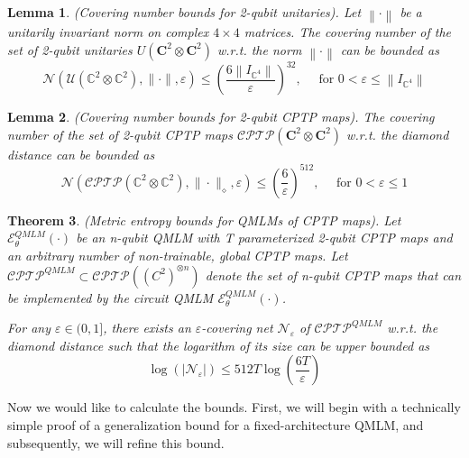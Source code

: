 \documentclass[%
 reprint,
 amsmath,amssymb,
 aps,
]{revtex4-2}
\newcommand{\E}{\mathcal{E}}
\newcommand{\norm}[1]{\left\lVert#1\right\rVert}
\newtheorem{theorem}{Theorem}[section]
\newtheorem{lemma}[theorem]{Lemma}
\begin{document}
\begin{lemma}
    (Covering number bounds for 2-qubit unitaries). Let $\norm{\cdot}$ be a unitarily invariant norm on complex $4 \times 4$ matrices. The covering number of the set of 2-qubit unitaries $U(\mathbf{C}^2 \otimes \mathbf{C}^2)$ w.r.t. the norm $\norm{\cdot}$ can be bounded as
    \begin{equation}
    \mathcal{N}\left(\mathcal{U}\left(\mathbb{C}^2 \otimes \mathbb{C}^2\right),\|\cdot\|, \varepsilon\right) \leqslant\left(\frac{6\left\|I_{\mathbb{C}^4}\right\|}{\varepsilon}\right)^{32}, \quad \text { for } 0<\varepsilon \leqslant\left\|I_{\mathbb{C}^4}\right\|
    \end{equation}
\end{lemma}

\begin{lemma}
    (Covering number bounds for 2-qubit CPTP maps). The covering number of the set of 2-qubit CPTP maps $\mathcal{CPTP}(\mathbf{C}^2 \otimes \mathbf{C}^2)$ w.r.t. the diamond distance can be bounded as
    \begin{equation}
    \mathcal{N}\left(\mathcal{CPTP}\left(\mathbb{C}^2 \otimes \mathbb{C}^2\right),\|\cdot\|_\diamond, \varepsilon\right) \leqslant\left(\frac{6}{\varepsilon}\right)^{512}, \quad \text { for } 0<\varepsilon \leqslant1
    \end{equation}
\end{lemma}

\begin{theorem}
    (Metric entropy bounds for QMLMs of CPTP maps). Let $\E^{QMLM}_\theta(\cdot)$ be an n-qubit QMLM with T parameterized 2-qubit CPTP maps and an arbitrary number of non-trainable, global CPTP maps. Let $\mathcal{CPTP}^{QMLM}\subset \mathcal{CPTP}((C^2)^{\otimes n})$ denote the set of n-qubit CPTP maps that can be implemented by the circuit QMLM $\E^{QMLM}_\theta(\cdot)$.

    For any $\varepsilon \in (0, 1]$, there exists an $\varepsilon$-covering net $\mathcal{N}_\varepsilon$ of $\mathcal{CPTP}^{QMLM}$ w.r.t. the diamond distance such that the logarithm of its size can be upper bounded as
    \begin{equation}
        \log(|\mathcal{N_\varepsilon}|)\le 512T\log\left(\frac{6T}{\varepsilon}\right)
    \end{equation}
    \label{thm: Metric entropy bounds}
\end{theorem}

Now we would like to calculate the bounds. First, we will begin with a technically simple proof of a generalization bound for a fixed-architecture QMLM, and subsequently, we will refine this bound.
\end{document}
